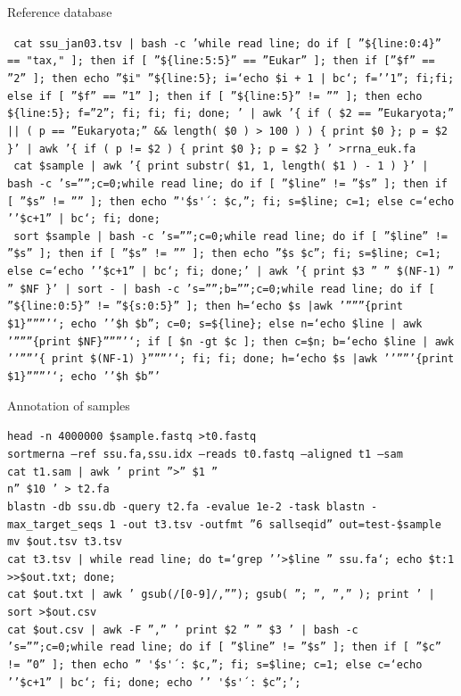 \documentclass[a4paper]{article}
\begin{document}
Reference database

\texttt{\small{ cat ssu\_jan03.tsv | bash -c 'while read line; do if [ ''\$\{line:0:4\}'' == "tax," ]; then if [ ''\$\{line:5:5\}'' == ''Eukar'' ]; then if [''\$f'' == ''2'' ]; then echo ''\$i" ''\$\{line:5\}; i=`echo \$i + 1 | bc`; f=''1''; fi;fi;  else if [ ''\$f'' == ''1'' ]; then if [ ''\$\{line:5\}'' != '''' ]; then echo \$\{line:5\}; f=''2''; fi; fi; fi; done; ' | awk '\{ if ( \$2 == ''Eukaryota;'' || ( p == ''Eukaryota;'' \&\& length( \$0 ) > 100 ) ) \{ print \$0 \}; p = \$2 \}' | awk '\{ if ( p != \$2 ) \{ print \$0 \}; p = \$2 \} ' >rrna\_euk.fa }} \\
\texttt{\small{ cat \$sample | awk '\{ print substr( \$1, 1, length( \$1 ) - 1 ) \}' | bash -c 's='''';c=0;while read line; do if [ ''\$line'' != ''\$s'' ]; then if [ ''\$s'' != '''' ]; then echo ''\''\$s\'' : \$c,''; fi; s=\$line; c=1; else c=`echo ''\$c+1'' | bc`; fi; done; }} \\
\texttt{\small{ sort \$sample |  bash -c 's='''';c=0;while read line; do if [ ''\$line'' != ''\$s'' ]; then if [ ''\$s'' != '''' ]; then echo ''\$s \$c''; fi; s=\$line; c=1; else c=`echo ''\$c+1'' | bc`; fi; done;' | awk '\{ print \$3 '' '' \$(NF-1) '' '' \$NF \}' | sort - | bash -c 's='''';b='''';c=0;while read line; do if [ ''\$\{line:0:5\}'' != ''\$\{s:0:5\}'' ]; then h=`echo \$s |awk '''''''\{print \$1\}'''''''`; echo ''\$h \$b''; c=0; s=\$\{line\}; else n=`echo \$line | awk '''''''\{print \$NF\}'''''''`; if [ \$n -gt \$c ]; then c=\$n; b=`echo \$line | awk '''''''\{ print \$(NF-1) \}'''''''`; fi; fi; done; h=`echo \$s |awk '''''''\{print \$1\}'''''''`; echo ''\$h \$b''' }} 

Annotation of samples

\texttt{\small{head -n 4000000 \$sample.fastq >t0.fastq}} \\
\texttt{\small{sortmerna --ref ssu.fa,ssu.idx --reads t0.fastq --aligned t1 --sam}} \\
\texttt{\small{cat t1.sam | awk '{ print ''>'' \$1 ''\\n'' \$10 }' > t2.fa}} \\
\texttt{\small{blastn -db ssu.db -query t2.fa -evalue 1e-2 -task blastn -max\_target\_seqs 1 -out t3.tsv -outfmt ''6 sallseqid'' out=test-\${sample}}} \\
\texttt{\small{mv \${out}.tsv t3.tsv }} \\
\texttt{\small{cat t3.tsv | while read line; do t=`grep ''>\$line '' ssu.fa`; echo \${t:1} >>\$out.txt; done; }} \\
\texttt{\small{cat \$out.txt | awk '{ gsub(/[0-9]/,''''); gsub( ''; '', '','' ); print }' | sort >\${out}.csv }} \\
\texttt{\small{cat \$out.csv | awk -F '','' '{ print \$2 '' '' \$3 }' | bash -c 's='''';c=0;while read line; do if [ ''\$line'' != ''\$s'' ]; then if [ ''\$c'' != ''0'' ]; then echo ''  \''\$s\'' : \$c,''; fi; s=\$line; c=1; else c=`echo ''\$c+1'' | bc`; fi; done; echo ''  \''\$s\'' : \$c'';'; }} 
\end{document}
